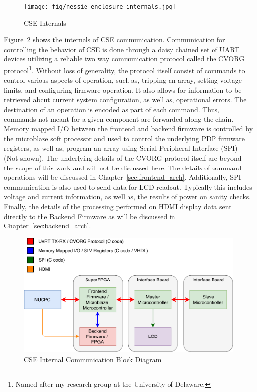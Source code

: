     \begin{figure}
        \centering
        \texttt{[image: fig/nessie\_enclosure\_internals.jpg]}
        \caption{CSE Internals}
        \label{fig:nessie_enclosure_internals}
    \end{figure}

    Figure~\ref{fig:cse_comm_block} shows the internals of CSE communication. Communication for controlling the behavior of CSE is done through a daisy chained set of UART devices utilizing a reliable two way communication protocol called the CVORG protocol\footnote{Named after my research group at the University of Delaware.}. Without loss of generality, the protocol itself consist of commands to control various aspects of operation, such as, tripping an array, setting voltage limits, and configuring firmware operation. It also allows for information to be retrieved about current system configuration, as well as, operational errors. The destination of an operation is encoded as part of each command. Thus, commands not meant for a given component are forwarded along the chain. Memory mapped I/O between the frontend and backend firmware is controlled by the microblaze soft processor and used to control the underlying PDP firmware registers, as well as, program an array using Serial Peripheral Interface (SPI) (Not shown). The underlying details of the CVORG protocol itself are beyond the scope of this work and will not be discussed here. The details of command operations will be discussed in Chapter~\ref{sec:frontend_arch}. Additionally, SPI communication is also used to send data for LCD readout. Typically this includes voltage and current information, as well as, the results of power on sanity checks. Finally, the details of the processing performed on HDMI display data sent directly to the Backend Firmware as will be discussed in Chapter~\ref{sec:backend_arch}.

    \begin{figure}
        \centering
        \includegraphics[width=1.0\textwidth]{fig/cse_comm_block.pdf}
        \caption{CSE Internal Communication Block Diagram}
        \label{fig:cse_comm_block}
    \end{figure}

